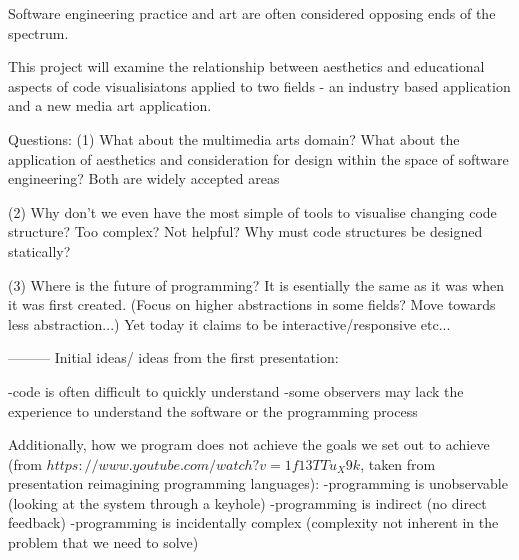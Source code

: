 








Software engineering practice and art are often considered opposing ends of the spectrum. 

This project will examine the relationship between aesthetics and educational aspects of code visualisiatons applied to two fields - an industry based application and a new media art application. 

Questions:
(1) What about the multimedia arts domain? What about the application of aesthetics and consideration for design within the space of software engineering? Both are widely accepted areas

(2) Why don't we even have the most simple of tools to visualise changing code structure? Too complex? Not helpful? Why must code structures be designed statically?

(3) Where is the future of programming? It is esentially the same as it was when it was first created. (Focus on higher abstractions in some fields? Move towards less abstraction...) Yet today it claims to be interactive/responsive etc...



---------
Initial ideas/ ideas from the first presentation:

-code is often difficult to quickly understand
-some observers may lack the experience to understand the software or the programming process

Additionally, how we program does not achieve the goals we set out to achieve (from $https://www.youtube.com/watch?v=1f13TTu_X9k$, taken from presentation reimagining programming languages):
-programming is unobservable (looking at the system through a keyhole)
-programming is indirect (no direct feedback)
-programming is incidentally complex (complexity not inherent in the problem that we need to solve)




